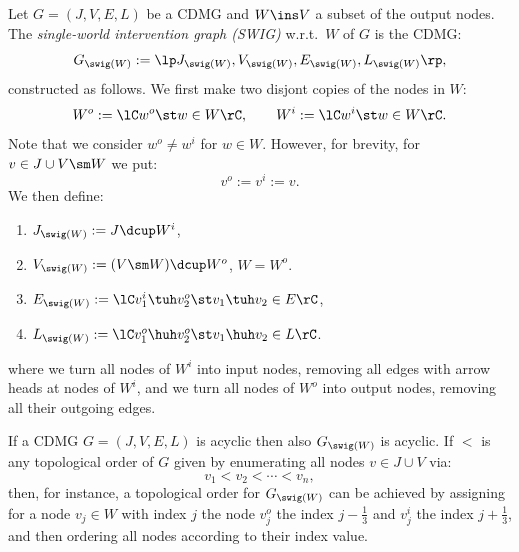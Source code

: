 \begin{Def}
  \label{def:G_node-splitting_intervention}
    Let $G=(J,V,E,L)$ be a CDMG and $W \ins V$ a subset of the output nodes.
    The \emph{single-world intervention graph (SWIG)} w.r.t.\ $W$ of $G$ is the CDMG: 
    \[ G_{\swig(W)} :=\lp J_{\swig(W)}, V_{\swig(W)}, E_{\swig(W)},L_{\swig(W)} \rp,\]
    constructed as follows.
    We first make two disjont copies of the nodes in $W$:
    \[ W^o:=\lC w^o\st w \in W \rC, \qquad W^i:=\lC w^i \st w \in W \rC.  \]
    Note that we consider $w^o \neq w^i$ for $w \in W$.
  However, for brevity, for $v \in J \cup V \sm W$ we put:
  \[ v^o:=v^i:=v.  \]
  We then define:
  \begin{enumerate}[label=\roman*.)]
      \item $J_{\swig(W)} := J \dcup W^i$,
      \item $V_{\swig(W)} := (V \sm W) \dcup W^o$, %
          $W=W^o$.
      \item $E_{\swig(W)} := \lC v^i_1 \tuh v_2^o \st v_1 \tuh v_2 \in E  \rC$,
      \item $L_{\swig(W)} :=\lC v_1^o \huh v_2^o \st v_1 \huh v_2 \in L \rC$.
  \end{enumerate}
  where we turn all nodes of $W^i$ into input nodes, removing all edges with arrow heads at nodes of $W^i$,
  and we turn all nodes of $W^o$ into output nodes, removing all their outgoing edges.
\end{Def}


\begin{Rem}
    If a CDMG $G=(J,V,E,L)$  is acyclic then also $G_{\swig(W)}$ is acyclic.
    If $<$ is any topological order of $G$ given by enumerating all nodes $v \in J \cup V$ via:
    \[ v_1 < v_2 < \cdots < v_n,\]
    then, for instance, 
    a topological order for $G_{\swig(W)}$ can be achieved by assigning for a node $v_j \in W$ with index $j$ the node 
    $v_j^o$ the index $j-\frac{1}{3}$
    and $v_j^i$ the index $j+\frac{1}{3}$, and then ordering all nodes according to their index value.
\end{Rem}

